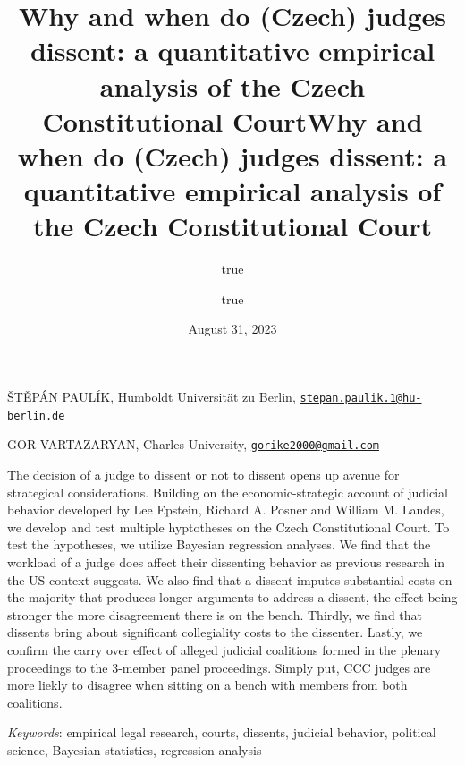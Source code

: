 \documentclass[
  11pt,
]{article}
\title{Why and when do (Czech) judges dissent: a quantitative empirical
analysis of the Czech Constitutional Court}
\author{true \and true}
\date{August 31, 2023}
\title{Why and when do (Czech) judges dissent: a quantitative empirical
analysis of the Czech Constitutional Court }
\date{}
\renewenvironment{abstract}
 {{%
    \setlength{\leftmargin}{0mm}
    \setlength{\rightmargin}{\leftmargin}%
  }%
  \relax}
 {\endlist}
\begin{document}



{%
\setlength{\parindent}{0pt}
\thispagestyle{plain}
{%
\maketitle  %

}




{
   \vskip 13.5pt\relax \normalsize\fontsize{11}{12}
   \MakeUppercase{Štěpán Paulík}, \small{Humboldt Universität zu Berlin,
\href{mailto:stepan.paulik.1@hu-berlin.de}{\nolinkurl{stepan.paulik.1@hu-berlin.de}}}   \par \vskip -3.5pt \MakeUppercase{Gor
Vartazaryan}, \small{Charles University,
\href{mailto:gorike2000@gmail.com}{\nolinkurl{gorike2000@gmail.com}}}   

}

}








\begin{abstract}


    \vskip 8.5pt %

\noindent \small{The decision of a judge to dissent or not to dissent
opens up avenue for strategical considerations. Building on the
economic-strategic account of judicial behavior developed by Lee
Epstein, Richard A. Posner and William M. Landes, we develop and test
multiple hyptotheses on the Czech Constitutional Court. To test the
hypotheses, we utilize Bayesian regression analyses. We find that the
workload of a judge does affect their dissenting behavior as previous
research in the US context suggests. We also find that a dissent imputes
substantial costs on the majority that produces longer arguments to
address a dissent, the effect being stronger the more disagreement there
is on the bench. Thirdly, we find that dissents bring about significant
collegiality costs to the dissenter. Lastly, we confirm the carry over
effect of alleged judicial coalitions formed in the plenary proceedings
to the 3-member panel proceedings. Simply put, CCC judges are more
liekly to disagree when sitting on a bench with members from both
coalitions.}


\vskip 8.5pt \noindent \emph{Keywords}: empirical legal research,
courts, dissents, judicial behavior, political science, Bayesian
statistics, regression analysis \par




\end{abstract}
\end{document}

